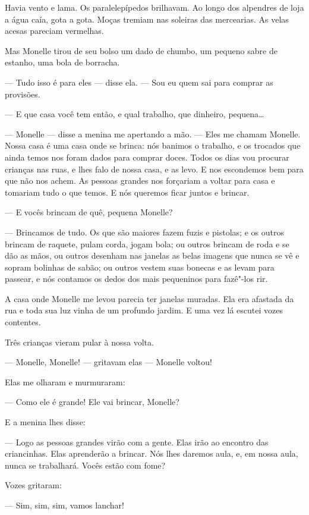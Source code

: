 Havia vento e lama. Os paralelepípedos brilhavam. Ao longo dos
alpendres de loja a água caía, gota a gota. Moças tremiam nas soleiras das
mercearias. As velas acesas pareciam vermelhas.

Mas Monelle tirou de seu bolso um dado de chumbo, um pequeno sabre de
estanho, uma bola de borracha.

--- Tudo isso é para eles --- disse ela. --- Sou eu quem sai para comprar as
provisões.

--- E que casa você tem então, e qual trabalho, que dinheiro, pequena\ldots{}

--- Monelle --- disse a menina me apertando a mão. --- Eles me chamam Monelle.
Nossa casa é uma casa onde se brinca: nós banimos o trabalho, e os
trocados que ainda temos nos foram dados para comprar doces. Todos os dias
vou procurar crianças nas ruas, e lhes falo de nossa casa, e as levo. E
nos escondemos bem para que não nos achem. As pessoas grandes nos
forçariam a voltar para casa e tomariam tudo o que temos. E nós queremos
ficar juntos e brincar.

--- E vocês brincam de quê, pequena Monelle?

--- Brincamos de tudo. Os que são maiores fazem fuzis e pistolas; e os
outros brincam de raquete, pulam corda, jogam bola; ou outros brincam de
roda e se dão as mãos, ou outros desenham nas janelas as belas imagens que
nunca se vê e sopram bolinhas de sabão; ou outros vestem suas bonecas e as
levam para passear, e nós contamos os dedos dos mais pequeninos para
fazê"-los rir.

A casa onde Monelle me levou parecia ter janelas muradas. Ela era
afastada da rua e toda sua luz vinha de um profundo jardim. E uma vez lá escutei
vozes contentes.

Três crianças vieram pular à nossa volta.

--- Monelle, Monelle! --- gritavam elas --- Monelle voltou!

Elas me olharam e murmuraram:

--- Como ele é grande! Ele vai brincar, Monelle?

E a menina lhes disse:

--- Logo as pessoas grandes virão com a gente. Elas irão ao encontro das
criancinhas. Elas aprenderão a brincar. Nós lhes daremos aula, e, em nossa
aula, nunca se trabalhará. Vocês estão com fome?

Vozes gritaram:

--- Sim, sim, sim, vamos lanchar!

